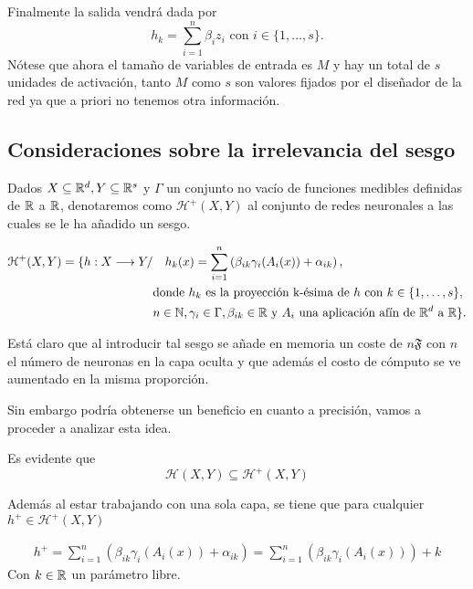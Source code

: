 Finalmente la salida vendrá dada por
 \begin{equation}
    h_k = \sum_{i=1}^n \beta_i z_i 
    \text{ con } i \in \{1, \ldots, s \}.
\end{equation}
Nótese que ahora el tamaño de variables de entrada es $M$
y hay un total de $s$ unidades de activación, tanto $M$ como $s$ son
valores fijados por el diseñador de la red ya que a priori no tenemos otra información. 
 
\subsection{Consideraciones sobre la irrelevancia del sesgo}

 Dados $X \subseteq \mathbb{R}^d, Y \subseteq \mathbb{R}^s$ y  $\Gamma$ un conjunto no vacío de funciones medibles definidas de $\mathbb{R}$ a $\mathbb{R}$, denotaremos como $\mathcal{H}^+(X,Y)$ al conjunto de redes neuronales a las cuales se le ha añadido un sesgo. 

\begin{align}
    \mathcal{H}^+(X,Y) 
    =
    \{
        h : X \longrightarrow Y 
        /& \quad 
        h_k(x) = 
        \sum_{i=1}^{n} \left( \beta_{i k} \gamma_{i}( A_{i}(x)) + \alpha_{i k} \right), \\
        & \text{donde  $h_k$  es la proyección k-ésima de $h$ con 
        $k \in \{1, \ldots, s\}$}, \\
        & n \in \mathbb{N},\gamma_{i} \in \Gamma , \beta_{i k} \in \mathbb{R}
         \text{ y }A_{i} \text{ una aplicación afín de $\mathbb{R}^d$ a $\mathbb{R}$}           
    \}.
\end{align}


Está claro que al introducir tal sesgo se añade en memoria 
un coste de $n \mathfrak{F}$ con $n$ el número de neuronas en la capa oculta y que además el costo de cómputo se ve aumentado en la misma proporción. 

Sin embargo podría obtenerse un beneficio en cuanto a precisión, 
vamos a proceder  a analizar esta idea. 

Es evidente que 
\begin{equation} \label{eq:conjuntos-redes-neuronales-con-sesgo-contiene-elemental}
    \mathcal{H}(X,Y) \subseteq \mathcal{H}^+(X,Y)
\end{equation}

Además al estar trabajando con una sola capa, se tiene que para cualquier 
$h^+ \in \mathcal{H}^+(X,Y)$

\begin{align}
    h^+ = \sum_{i=1}^{n} \left(\beta_{i k} \gamma_{i}( A_{i}(x)) + \alpha_{i k} \right)
    = \sum_{i=1}^{n} \left(\beta_{i k} \gamma_{i}( A_{i}(x))\right) + k 
\end{align}
Con $k \in \mathbb{R}$ un parámetro libre.

